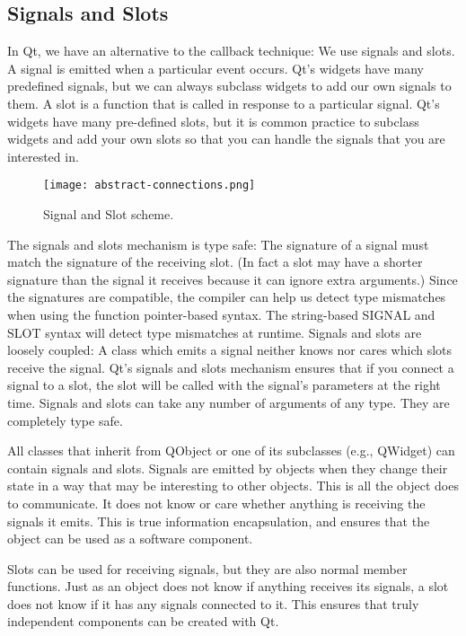 \subsection{Signals and Slots}
\label{ssec:soft-sig-solt-detail}
In Qt, we have an alternative to the callback technique: We use signals and
slots. A signal is emitted when a particular event occurs. Qt's widgets have
many predefined signals, but we can always subclass widgets to add our own
signals to them. A slot is a function that is called in response to a particular
signal. Qt's widgets have many pre-defined slots, but it is common practice to
subclass widgets and add your own slots so that you can handle the signals that
you are interested in. 
%
%
\begin{figure}[htb]
	\centering
	\texttt{[image: abstract-connections.png]}
	\caption{Signal and Slot scheme.}
	\label{fig:software-signal-slots-scheme}
\end{figure}
%
The signals and slots mechanism is type safe: The signature of a signal must
match the signature of the receiving slot. (In fact a slot may have a shorter
signature than the signal it receives because it can ignore extra arguments.)
Since the signatures are compatible, the compiler can help us detect type
mismatches when using the function pointer-based syntax. The string-based SIGNAL
and SLOT syntax will detect type mismatches at runtime. Signals and slots are
loosely coupled: A class which emits a signal neither knows nor cares which
slots receive the signal. Qt's signals and slots mechanism ensures that if you
connect a signal to a slot, the slot will be called with the signal's parameters
at the right time. Signals and slots can take any number of arguments of any
type. They are completely type safe.

All classes that inherit from QObject or one of its subclasses (e.g., QWidget)
can contain signals and slots. Signals are emitted by objects when they change
their state in a way that may be interesting to other objects. This is all the
object does to communicate. It does not know or care whether anything is
receiving the signals it emits. This is true information encapsulation, and
ensures that the object can be used as a software component.

Slots can be used for receiving signals, but they are also normal member
functions. Just as an object does not know if anything receives its signals, a
slot does not know if it has any signals connected to it. This ensures that
truly independent components can be created with Qt.


